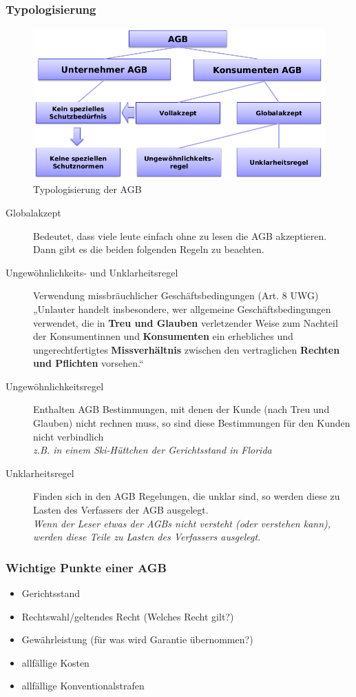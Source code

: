 \subsubsection{Typologisierung}
\begin{figure}[H]
\centering
\includegraphics[width=.9\textwidth]{figures/typolisierungAGB.png}
\caption{Typologisierung der AGB}
\end{figure}

\begin{description}
	\item[Globalakzept] Bedeutet, dass viele leute einfach ohne zu lesen
	die AGB akzeptieren. Dann gibt es die beiden folgenden Regeln zu
	beachten.
	\item[Ungewöhnlichkeits- und Unklarheitsregel]
	Verwendung missbräuchlicher Geschäftsbedingungen (Art. 8 UWG) „Unlauter
	handelt insbesondere, wer allgemeine Geschäftsbedingungen verwendet, die
	in \textbf{Treu und Glauben} verletzender Weise zum Nachteil der
	Konsumentinnen und \textbf{Konsumenten} ein erhebliches und
	ungerechtfertigtes \textbf{Missverhältnis} zwischen den vertraglichen
	\textbf{Rechten und Pflichten} vorsehen.``
	\item[Ungewöhnlichkeitsregel]  Enthalten AGB Bestimmungen, mit denen
	der Kunde (nach Treu und Glauben) nicht rechnen muss, so sind diese
	Bestimmungen für den Kunden nicht verbindlich\\
	\emph{z.B. in einem Ski-Hüttchen der Gerichtsstand in Florida}
	\item[Unklarheitsregel] Finden sich in den AGB Regelungen, die unklar
	sind, so werden diese zu Lasten des Verfassers der AGB ausgelegt.\\
	\emph{Wenn der Leser etwas der AGBs nicht versteht (oder verstehen
	kann), werden diese Teile zu Lasten des Verfassers ausgelegt.}
\end{description}

\subsubsection{Wichtige Punkte einer AGB}
\begin{itemize}
	\tightlist
	\item Gerichtsstand
	\item Rechtswahl/geltendes Recht (Welches Recht gilt?)
	\item Gewährleistung (für was wird Garantie übernommen?)
	\item allfällige Kosten
	\item allfällige Konventionalstrafen
\end{itemize}

